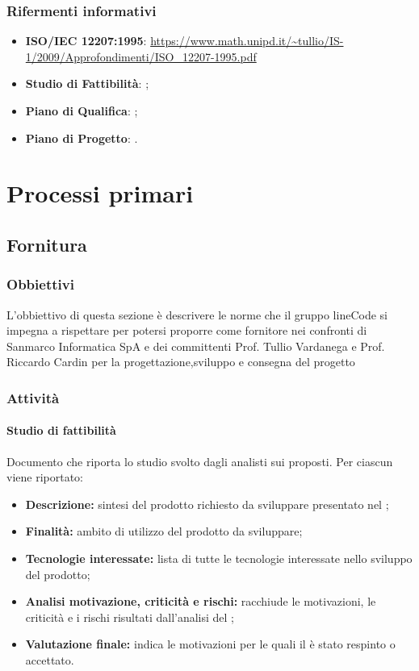 \documentclass[]{article}
\begin{document}
			\subsubsection{Rifermenti informativi}
			\begin{itemize}
				\item \textbf{ISO/IEC 12207:1995}: \url{https://www.math.unipd.it/~tullio/IS-1/2009/Approfondimenti/ISO_12207-1995.pdf}
				\item \textbf{Studio di Fattibilità}: ; %
				\item \textbf{Piano di Qualifica}: ;
				\item \textbf{Piano di Progetto}: .
			\end{itemize}
		
		
			\newpage
			
			\section{Processi primari}
			
				\subsection{Fornitura}
				
					\subsubsection{Obbiettivi}
					L'obbiettivo di questa sezione è descrivere le norme che il gruppo lineCode si impegna a rispettare per potersi proporre come fornitore nei confronti di Sanmarco Informatica SpA e dei committenti Prof. Tullio Vardanega e Prof. Riccardo Cardin per la progettazione,sviluppo e consegna del progetto 
					
					\subsubsection{Attività}
						\paragraph{Studio di fattibilità}
					    	Documento che riporta lo studio svolto dagli analisti sui  proposti. Per ciascun  viene riportato:
						 \begin{itemize}
						 	\item \textbf{Descrizione:} sintesi del prodotto richiesto da sviluppare presentato nel ; 
						 	\item \textbf{Finalità:} ambito di utilizzo del prodotto da sviluppare;
						 	\item \textbf{Tecnologie interessate:} lista di tutte le tecnologie interessate nello sviluppo del prodotto;
						 	\item \textbf{Analisi motivazione, criticità e rischi:} racchiude le motivazioni, le criticità e i rischi risultati dall'analisi del ; 
						 	\item \textbf{Valutazione finale:} indica le motivazioni per le quali il  è stato respinto o accettato.
						 \end{itemize}
						  
\end{document}
